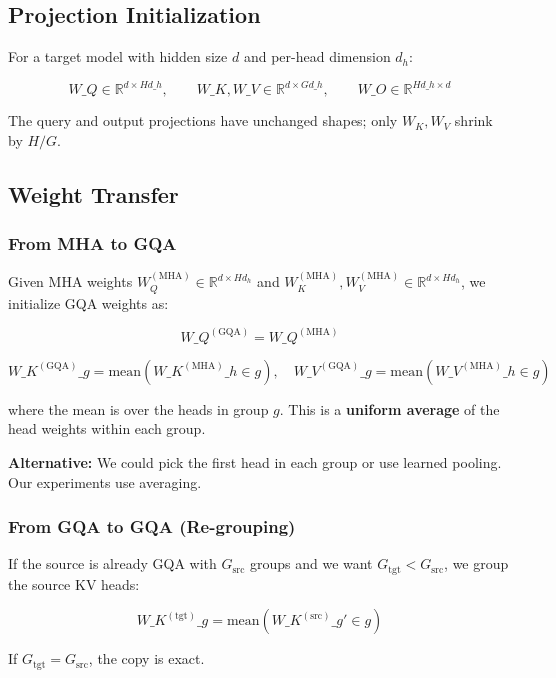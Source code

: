 \subsection{Projection Initialization}

For a target model with hidden size $d$ and per-head dimension $d_h$:

\[
W\_Q \in \mathbb{R}^{d \times H d\_h}, \qquad
W\_K, W\_V \in \mathbb{R}^{d \times G d\_h}, \qquad
W\_O \in \mathbb{R}^{H d\_h \times d}
\tag{4.1}
\]

The query and output projections have unchanged shapes; only $W_K, W_V$ 
shrink by $H / G$.

\subsection{Weight Transfer}

\subsubsection{From MHA to GQA}

Given MHA weights $W_Q^{(\text{MHA})} \in \mathbb{R}^{d \times H d_h}$ and 
$W_K^{(\text{MHA})}, W_V^{(\text{MHA})} \in \mathbb{R}^{d \times H d_h}$, we 
initialize GQA weights as:

\[
W\_Q^{(\text{GQA})} = W\_Q^{(\text{MHA})}
\tag{4.2}
\]

\[
W\_K^{(\text{GQA})}\_g = \text{mean}\!\left(W\_K^{(\text{MHA})}\_{h \in g}\right), \quad
W\_V^{(\text{GQA})}\_g = \text{mean}\!\left(W\_V^{(\text{MHA})}\_{h \in g}\right)
\tag{4.3}
\]

where the mean is over the heads in group $g$. This is a \textbf{uniform average} 
of the head weights within each group.

\textbf{Alternative:} We could pick the first head in each group or use learned 
pooling. Our experiments use averaging.

\subsubsection{From GQA to GQA (Re-grouping)}

If the source is already GQA with $G_\text{src}$ groups and we want 
$G_\text{tgt} < G_\text{src}$, we group the source KV heads:

\[
W\_K^{(\text{tgt})}\_g = \text{mean}\!\left(W\_K^{(\text{src})}\_{g' \in g}\right)
\tag{4.4}
\]

If $G_\text{tgt} = G_\text{src}$, the copy is exact.

